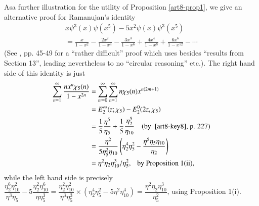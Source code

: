 \begin{remark*}
As\pageoriginale a further illustration for the utility of Proposition \ref{art8-prop1}, we give an alternative proof for Ramanujan's identity
\begin{gather*}
x\psi^{3}(x)\psi(x^{5})-5x^{2}\psi(x)\psi^{3}(x^{5})\\
=\frac{x}{1-x^{2}}-\frac{2x^{2}}{1-x^{4}}-\frac{3x^{3}}{1-x^{6}}+\frac{4x^{4}}{1-x^{8}}+\frac{6x^{6}}{1-x^{12}}-\cdots
\end{gather*}
(See \cite{art8-key1}, pp. 45-49 for a ``rather difficult'' proof which uses besides ``results from Section 13'', leading nevertheless to no ``circular reasoning'' etc.). The right hand side of this identity is just
\begin{align*}
\sum\limits^{\infty}_{n=1}\frac{nx^{n}\chi_{5}(n)}{1-x^{2n}} &= \sum\limits^{\infty}_{m=0}\sum\limits^{\infty}_{n=1}n\chi_{5}(n)x^{n(2m+1)}\\
&= E^{\infty}_{2}(z;\chi_{5})-E^{0}_{2}(2z,\chi_{5})\\
&= \frac{1}{5}\frac{\eta^{5}}{\eta_{5}}+\frac{1}{5}\frac{\eta^{5}_{2}}{\eta_{10}}\quad (\text{by~ \cite{art8-key8}, p. 227})\\
&= \frac{\eta^{2}}{5\eta^{2}_{5}\eta_{10}}\left(\eta^{4}_{2}\eta^{2}_{5}-\frac{\eta^{5}\eta_{5}\eta_{10}}{\eta_{2}}\right)\\
&= \eta^{2}\eta_{2}\eta^{3}_{10}/\eta^{2}_{5},\text{~~ by Proposition 1(ii),}
\end{align*}
while the left hand side is precisely $\dfrac{\eta^{6}_{2}\eta^{2}_{10}}{\eta^{3}\eta_{5}}-5\dfrac{\eta^{2}_{2}\eta^{6}_{10}}{\eta\eta^{3}_{5}}=\dfrac{\eta^{2}_{2}\eta^{2}_{10}}{\eta^{3}\eta^{3}_{5}}\times (\eta^{4}_{2}\eta^{2}_{5}-5\eta^{2}\eta^{4}_{10})=\dfrac{\eta^{2}\eta_{2}\eta^{3}_{10}}{\eta^{2}_{5}}$, using Proposition 1(i).
\end{remark*}

